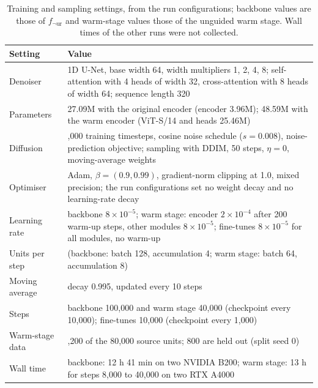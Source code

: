 \documentclass[10pt,a4paper]{article}
\newcommand{\botrule}{\bottomrule}
\newcommand{\fnot}[1]{f_{\neg\mathrm{#1}}}
\begin{document}
\begin{table}[!htbp]
\centering
\caption{Training and sampling settings, from the run configurations; backbone values are those of $\fnot{ur}$ and warm-stage values those of the unguided warm stage. Wall times of the other runs were not collected.}\label{tabS:hyper}
\scriptsize\setlength{\tabcolsep}{3pt}
\begin{tabular}{@{}>{\raggedright\arraybackslash}p{}>{\raggedright\arraybackslash}p{}@{}}
\toprule
Setting & Value\\
\midrule
Denoiser & 1D U-Net, base width 64, width multipliers 1, 2, 4, 8; self-attention with 4 heads of width 32, cross-attention with 8 heads of width 64; sequence length 320\\
Parameters & 27.09M with the original encoder (encoder 3.96M); 48.59M with the warm encoder (ViT-S/14 and heads 25.46M)\\
Diffusion & 1,000 training timesteps, cosine noise schedule ($s=0.008$), noise-prediction objective; sampling with DDIM, 50 steps, $\eta=0$, moving-average weights\\
Optimiser & Adam, $\beta=(0.9, 0.99)$, gradient-norm clipping at 1.0, mixed precision; the run configurations set no weight decay and no learning-rate decay\\
Learning rate & backbone $8\times10^{-5}$; warm stage: encoder $2\times10^{-4}$ after 200 warm-up steps, other modules $8\times10^{-5}$; fine-tunes $8\times10^{-5}$ for all modules, no warm-up\\
Units per step & 512 (backbone: batch 128, accumulation 4; warm stage: batch 64, accumulation 8)\\
Moving average & decay 0.995, updated every 10 steps\\
Steps & backbone 100,000 and warm stage 40,000 (checkpoint every 10,000); fine-tunes 10,000 (checkpoint every 1,000)\\
Warm-stage data & 79,200 of the 80,000 source units; 800 are held out (split seed 0)\\
Wall time & backbone: 12 h 41 min on two NVIDIA B200; warm stage: 13 h for steps 8,000 to 40,000 on two RTX A4000\\
\botrule
\end{tabular}
\end{table}
\end{document}
